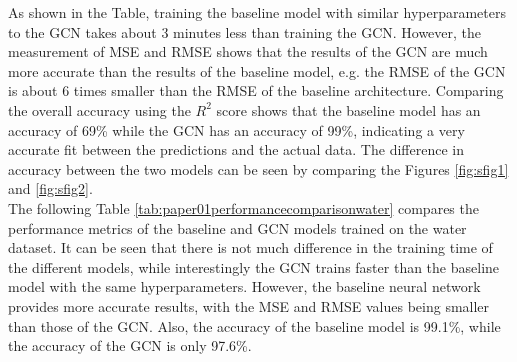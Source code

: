As shown in the Table, training the baseline model with similar hyperparameters to the GCN takes about 3 minutes less than training the GCN. However, the measurement of MSE and RMSE shows that the results of the GCN are much more accurate than the results of the baseline model, e.g. the RMSE of the GCN is about 6 times smaller than the RMSE of the baseline architecture. Comparing the overall accuracy using the $R^2$ score shows that the baseline model has an accuracy of 69\% while the GCN has an accuracy of 99\%, indicating a very accurate fit between the predictions and the actual data. The difference in accuracy between the two models can be seen by comparing the Figures \ref{fig:sfig1} and \ref{fig:sfig2}.\\

The following Table \ref{tab:paper01performancecomparisonwater} compares the performance metrics of the baseline and GCN models trained on the water dataset. It can be seen that there is not much difference in the training time of the different models, while interestingly the GCN trains faster than the baseline model with the same hyperparameters. However, the baseline neural network provides more accurate results, with the MSE and RMSE values being smaller than those of the GCN. Also, the accuracy of the baseline model is 99.1\%, while the accuracy of the GCN is only 97.6\%.

\begin{table}[h]
    \centering
    \captionsetup{justification=centering}
       \caption[Comparison of performance metrics of the developed model (water dataset)]{\label{tab:paper01performancecomparisonwater} Comparison of performance metrics of the developed model [water dataset]}
\end{table}

